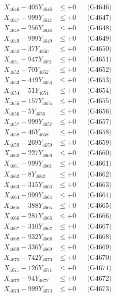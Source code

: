 \documentclass[a4paper,10pt]{article}
\begin{document}
{\begin{align}
X_{4646} - 405Y_{4646} &\leq +0 && \text{(G4646)} \\
X_{4647} - 999Y_{4647} &\leq +0 && \text{(G4647)} \\
X_{4648} - 256Y_{4648} &\leq +0 && \text{(G4648)} \\
X_{4649} - 999Y_{4649} &\leq +0 && \text{(G4649)} \\
X_{4650} - 37Y_{4650} &\leq +0 && \text{(G4650)} \\
\allowbreak
X_{4651} - 947Y_{4651} &\leq +0 && \text{(G4651)} \\
X_{4652} - 70Y_{4652} &\leq +0 && \text{(G4652)} \\
X_{4653} - 449Y_{4653} &\leq +0 && \text{(G4653)} \\
X_{4654} - 51Y_{4654} &\leq +0 && \text{(G4654)} \\
X_{4655} - 157Y_{4655} &\leq +0 && \text{(G4655)} \\
X_{4656} - 5Y_{4656} &\leq +0 && \text{(G4656)} \\
X_{4657} - 999Y_{4657} &\leq +0 && \text{(G4657)} \\
X_{4658} - 46Y_{4658} &\leq +0 && \text{(G4658)} \\
X_{4659} - 269Y_{4659} &\leq +0 && \text{(G4659)} \\
X_{4660} - 227Y_{4660} &\leq +0 && \text{(G4660)} \\
\allowbreak
X_{4661} - 999Y_{4661} &\leq +0 && \text{(G4661)} \\
X_{4662} - 8Y_{4662} &\leq +0 && \text{(G4662)} \\
X_{4663} - 315Y_{4663} &\leq +0 && \text{(G4663)} \\
X_{4664} - 999Y_{4664} &\leq +0 && \text{(G4664)} \\
X_{4665} - 388Y_{4665} &\leq +0 && \text{(G4665)} \\
X_{4666} - 281Y_{4666} &\leq +0 && \text{(G4666)} \\
X_{4667} - 310Y_{4667} &\leq +0 && \text{(G4667)} \\
X_{4668} - 932Y_{4668} &\leq +0 && \text{(G4668)} \\
X_{4669} - 336Y_{4669} &\leq +0 && \text{(G4669)} \\
X_{4670} - 742Y_{4670} &\leq +0 && \text{(G4670)} \\
\allowbreak
X_{4671} - 126Y_{4671} &\leq +0 && \text{(G4671)} \\
X_{4672} - 94Y_{4672} &\leq +0 && \text{(G4672)} \\
X_{4673} - 999Y_{4673} &\leq +0 && \text{(G4673)} \\

\end{align}}
\end{document}
